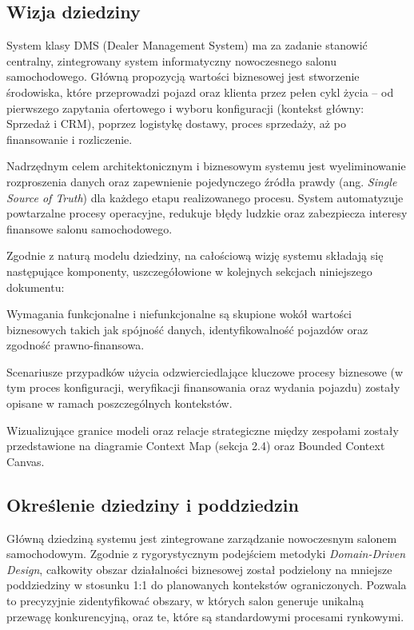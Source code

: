 \subsection{Wizja dziedziny}
System klasy DMS (Dealer Management System) ma za zadanie stanowić centralny, zintegrowany system informatyczny nowoczesnego salonu samochodowego. Główną propozycją wartości biznesowej jest stworzenie środowiska, które przeprowadzi pojazd oraz klienta przez pełen cykl życia – od pierwszego zapytania ofertowego i wyboru konfiguracji (kontekst główny: Sprzedaż i CRM), poprzez logistykę dostawy, proces sprzedaży, aż po finansowanie i rozliczenie.

Nadrzędnym celem architektonicznym i biznesowym systemu jest wyeliminowanie rozproszenia danych oraz zapewnienie pojedynczego źródła prawdy (ang. \textit{Single Source of Truth}) dla każdego etapu realizowanego procesu. System automatyzuje powtarzalne procesy operacyjne, redukuje błędy ludzkie oraz zabezpiecza interesy finansowe salonu samochodowego.

Zgodnie z naturą modelu dziedziny, na całościową wizję systemu składają się następujące komponenty, uszczegółowione w kolejnych sekcjach niniejszego dokumentu:

Wymagania funkcjonalne i niefunkcjonalne są skupione wokół wartości biznesowych takich jak spójność danych, identyfikowalność pojazdów oraz zgodność prawno-finansowa.

Scenariusze przypadków użycia odzwierciedlające kluczowe procesy biznesowe (w tym proces konfiguracji, weryfikacji finansowania oraz wydania pojazdu) zostały opisane w ramach poszczególnych kontekstów.

Wizualizujące granice modeli oraz relacje strategiczne między zespołami zostały przedstawione na diagramie Context Map (sekcja 2.4) oraz Bounded Context Canvas.

\subsection{Określenie dziedziny i poddziedzin}

Główną dziedziną systemu jest zintegrowane zarządzanie nowoczesnym salonem samochodowym. Zgodnie z rygorystycznym podejściem metodyki \textit{Domain-Driven Design}, całkowity obszar działalności biznesowej został podzielony na mniejsze poddziedziny w stosunku 1:1 do planowanych kontekstów ograniczonych. Pozwala to precyzyjnie zidentyfikować obszary, w których salon generuje unikalną przewagę konkurencyjną, oraz te, które są standardowymi procesami rynkowymi.

